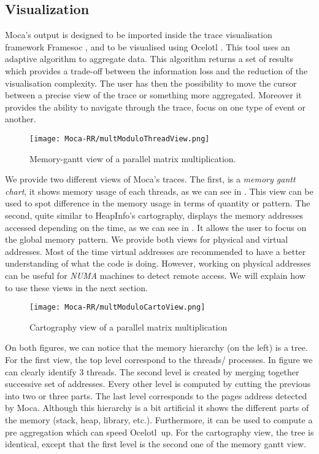 \subsection{Visualization}



\gls{Moca}'s output is designed to be imported inside the trace visualisation framework \gls{Framesoc} \cite{Pagano13Trace}, and to be visualised using \gls{Ocelotl} \cite{Dosimont14Trace}.
This tool uses an adaptive algorithm to aggregate data.
This algorithm returns a set of results which provides a trade-off between the information loss and the reduction of the visualisation complexity.
The user has then the possibility to move the cursor between a precise view of the trace or something more aggregated.
Moreover it provides the ability to navigate through the trace, focus on one type of event or another.

\begin{figure}[htb]
    \centering
    \texttt{[image: Moca-RR/multModuloThreadView.png]}
    \caption{Memory-gantt view of a parallel matrix multiplication.}
    \label{fig:ocelotl-th0}
\end{figure}


We provide two different views of \gls{Moca}'s traces.
The first, is a \emph{memory gantt chart}, it shows memory usage of each threads, as we can see in .
This view can be used to spot difference in the memory usage in terms of quantity or pattern.
The second, quite similar to HeapInfo's cartography, displays the memory addresses accessed depending on the time, as we can see in .
It allows the user to focus on the global memory pattern.
We provide both views for physical and virtual addresses.
Most of the time virtual addresses are recommended to have a better understanding of what the code is doing.
However, working on physical addresses can be useful for \emph{NUMA} machines to detect remote access.
We will explain how to use these views in the next section.

\begin{figure}[htb]
    \centering
    \texttt{[image: Moca-RR/multModuloCartoView.png]}
    \caption{Cartography view of a parallel matrix multiplication}
    \label{fig:ocelotl-carto0}
\end{figure}

On both figures, we can notice that the memory hierarchy (on the left) is a tree.
For the first view, the top level correspond to the threads/ processes.
In figure  we can clearly identify $3$ threads.
The second level is created by merging together successive set of addresses.
Every other level is computed by cutting the previous into two or three parts.
The last level corresponds to the pages address detected by \gls{Moca}.
 Although this hierarchy is a bit artificial it shows the different parts of the memory (stack, heap, library, etc.).
Furthermore, it can be used to compute a pre aggregation which can speed \gls{Ocelotl}~up.
For the cartography view, the tree is identical, except that the first level is the second one of the memory gantt view.

